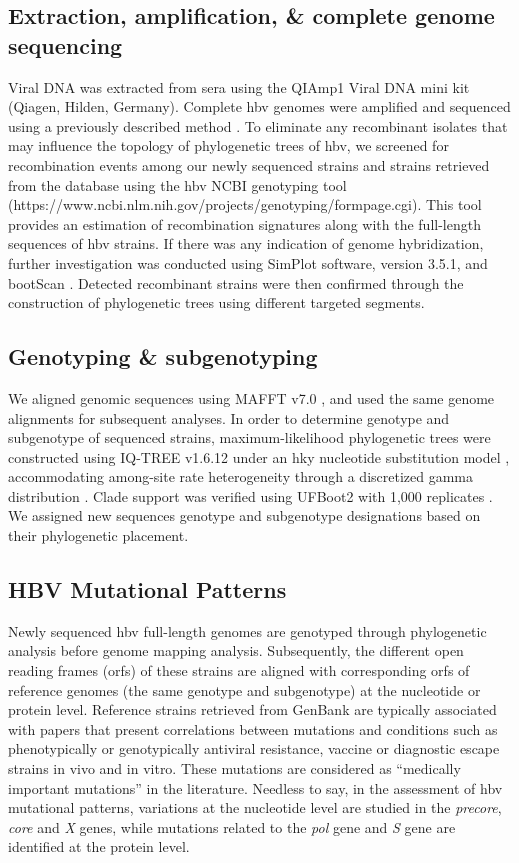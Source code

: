\subsection{Extraction, amplification, \& complete genome sequencing}
Viral DNA was extracted from sera using the QIAmp1 Viral DNA mini kit (Qiagen, Hilden, Germany).
Complete \gls{hbv} genomes were amplified and sequenced using a previously described method \citep{pourkarim2011molecular,pourkarim_phylogenetic_2009}.
To eliminate any recombinant isolates that may influence the topology of phylogenetic trees of \gls{hbv}, we screened for recombination events among our newly sequenced strains and strains retrieved from the database using the \gls{hbv} NCBI genotyping tool (https://www.ncbi.nlm.nih.gov/projects/genotyping/formpage.cgi).
This tool provides an estimation of recombination signatures along with the full-length sequences of \gls{hbv} strains.
If there was any indication of genome hybridization, further investigation was conducted using SimPlot software, version 3.5.1, and bootScan \citep{lole_full-length_1999}.
Detected recombinant strains were then confirmed through the construction of phylogenetic trees using different targeted segments.

\subsection{Genotyping \& subgenotyping}
We aligned genomic sequences using MAFFT v7.0 \citep{katoh2013mafft}, and used the same genome alignments for subsequent analyses.
In order to determine genotype and subgenotype of sequenced strains, maximum-likelihood phylogenetic trees were constructed using IQ-TREE v1.6.12 \citep{nguyen2015iq} under an \gls{hky} nucleotide substitution model \citep{hasegawa1985dating}, accommodating among-site rate heterogeneity through a discretized gamma distribution \citep{yang_maximum_1994}.
Clade support was verified using UFBoot2 with 1,000 replicates \citep{hoang_ufboot2_2018}.
We assigned new sequences genotype and subgenotype designations based on their phylogenetic placement.

\subsection{HBV Mutational Patterns}
Newly sequenced \gls{hbv} full-length genomes are genotyped through phylogenetic analysis before genome mapping analysis.
Subsequently, the different open reading frames (\gls{orf}s) of these strains are aligned with corresponding \gls{orf}s of reference genomes (the same genotype and subgenotype) at the nucleotide or protein level.
Reference strains retrieved from GenBank are typically associated with papers that present correlations between mutations and conditions such as phenotypically or genotypically antiviral resistance, vaccine or diagnostic escape strains in vivo and in vitro.
These mutations are considered as ``medically important mutations'' in the literature.
Needless to say, in the assessment of \gls{hbv} mutational patterns, variations at the nucleotide level are studied in the \textit{precore}, \textit{core} and \textit{X} genes, while mutations related to the \textit{pol} gene and \textit{S} gene are identified at the protein level.

